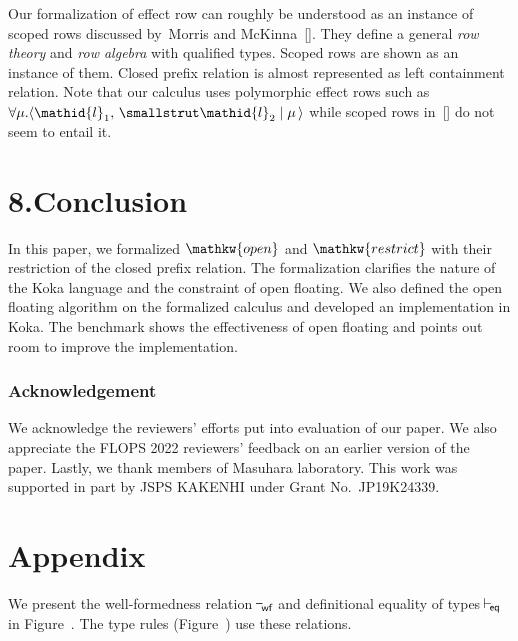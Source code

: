 \documentclass{llncs}
\newcommand{\midbar}{\mid}
\begin{document}
Our formalization of effect row can roughly be understood as
an instance of scoped rows discussed by~Morris and McKinna~[].
They define a general \emph{row theory} and \emph{row algebra} with qualified types.
Scoped rows are shown as an instance of them.
Closed prefix relation is almost represented as left containment relation.
Note that our calculus uses polymorphic effect rows such as $\mathpre{\forall \mu{}.\langle{}\mathid{l}_{1},~\mathid{l}_{2}\midbar{}\mu{}\,\rangle{}}$
while scoped rows in~[] do not seem to entail it.%






\section{8.\hspace*{0.5em}Conclusion}%

\noindent In this paper, we formalized $\mathpre{\mathkw{open}}$ and $\mathpre{\mathkw{restrict}}$ with their restriction of the closed prefix relation.
The formalization clarifies the nature of the Koka language and the constraint of open floating.
We also defined the open floating algorithm on the formalized calculus and developed an implementation in Koka.
The benchmark shows the effectiveness of open floating and points out room to improve the implementation.%

\subsubsection*{Acknowledgement}%


\noindent We acknowledge the reviewers' efforts put into evaluation of our paper.
We also appreciate the FLOPS 2022 reviewers' feedback on an earlier version of the paper.
Lastly, we thank members of Masuhara laboratory.%
This work was supported in part by JSPS KAKENHI under Grant No.~JP19K24339. 


\section*{Appendix}%


\noindent We present the well-formedness relation $\mathpre{\!\vdash_{\!\textsf{wf}}}$ and definitional equality of types $\mathpre{\!\vdash_{\!\textsf{eq}}}$ in Figure~.
The type rules (Figure~) use these relations.%
\end{document}
